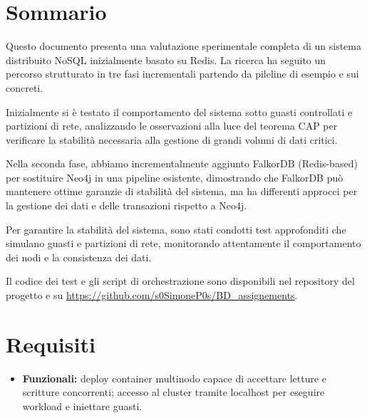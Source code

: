 \documentclass{article}
\begin{document}



\section*{Sommario}

Questo documento presenta una valutazione sperimentale completa di un sistema distribuito NoSQL inizialmente basato su Redis. %
La ricerca ha seguito un percorso strutturato in tre fasi incrementali partendo da pileline di esempio e sui concreti.

Inizialmente si è testato il comportamento del sistema sotto guasti controllati e partizioni di rete, %
analizzando le osservazioni alla luce del teorema CAP per verificare la stabilità necessaria alla gestione di %
grandi volumi di dati critici.

Nella seconda fase, abbiamo incrementalmente aggiunto FalkorDB (Redis-based) per sostituire Neo4j %
in una pipeline esistente, dimostrando che %
FalkorDB può mantenere ottime garanzie di stabilità del sistema, ma ha differenti approcci per la gestione %
dei dati e delle transazioni rispetto a Neo4j.

Per garantire la stabilità del sistema, sono stati condotti test approfonditi che simulano guasti e %
partizioni di rete, monitorando attentamente il comportamento dei nodi e la consistenza dei dati.

Il codice dei test e gli script di orchestrazione sono %
disponibili nel repository del progetto e su %
\url{https://github.com/s0SimoneP0s/BD_assignements}.



\tableofcontents
{}
\newpage

\section{Requisiti}
\begin{itemize}
    \item \textbf{Funzionali:} deploy container multinodo capace di accettare letture e scritture concorrenti; %
    accesso al cluster tramite localhost per eseguire workload e iniettare guasti.
\end{itemize}
\end{document}
